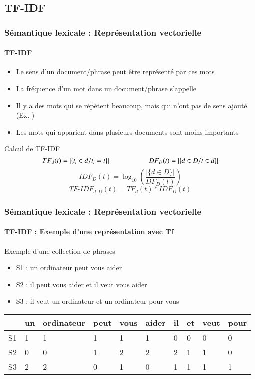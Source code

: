 \documentclass[xcolor=table]{beamer}
\begin{document}
\subsection{TF-IDF}

\begin{frame}
\frametitle{Sémantique lexicale : Représentation vectorielle}
\framesubtitle{TF-IDF}

\begin{itemize}
	\item Le sens d'un document/phrase peut être représenté par ces mots 
	\item La fréquence d'un mot dans un document/phrase s'appelle 
	\item Il y a des mots qui se répètent beaucoup, mais qui n'ont pas de sens ajouté (Ex. )
	\item Les mots qui apparient dans plusieurs documents sont moins importants
\end{itemize}

\begin{block}{Calcul de TF-IDF}
	\[
	TF_d(t) =  |\{t_i \in d / t_i = t\}|
	\hskip2cm 
	DF_D(t) = |\{d \in D / t \in d\}|
	\]
	\[IDF_D(t) = \log_{10} \left( \frac{|\{d \in D\}|}{DF_D(t)} \right)\]
	\[TF\text{-}IDF_{d, D}(t) = TF_d(t) * IDF_D(t)\]
\end{block}

\end{frame}


\begin{frame}
\frametitle{Sémantique lexicale : Représentation vectorielle}
\framesubtitle{TF-IDF : Exemple d'une représentation avec Tf}

\begin{exampleblock}{Exemple d'une collection de phrases}
	\begin{itemize}
		\item S1 : un ordinateur peut vous aider
		\item S2 : il peut vous aider et il veut vous aider
		\item S3 : il veut un ordinateur et un ordinateur pour vous
	\end{itemize}
\end{exampleblock}

\begin{center}
	\begin{tabular}{llllllllll}
	\hline\hline
	& un & ordinateur & peut & vous & aider & il & et & veut & pour \\
	\hline
	S1 & 1 & 1 & 1 & 1 & 1 & 0 & 0 & 0 & 0\\
	S2 & 0 & 0 & 1 & 2 & 2 & 2 & 1 & 1 & 0\\
	S3 & 2 & 2 & 0 & 1 & 0 & 1 & 1 & 1 & 1\\
	\hline\hline
\end{tabular}
\end{center}

\end{frame}
\end{document}

